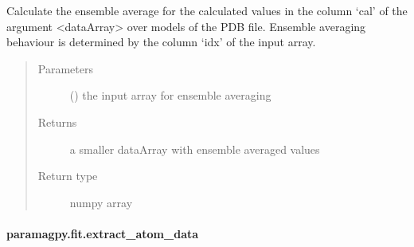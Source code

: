 \documentclass[a4paper,10pt,english,openany,oneside]{sphinxmanual}
\begin{document}
\begin{fulllineitems}
\label{\detokenize{reference/generated/paramagpy.fit.ensemble_average:paramagpy.fit.ensemble_average}}
\sphinxAtStartPar
Calculate the ensemble average for the calculated values in the
column ‘cal’ of the argument \textless{}dataArray\textgreater{} over models of the
PDB file.
Ensemble averaging behaviour is determined by the column ‘idx’
of the input array.
\begin{quote}\begin{description}
\item[{Parameters}] \leavevmode
\sphinxAtStartPar
{} () \textendash{} the input array for ensemble averaging

\item[{Returns}] \leavevmode
\sphinxAtStartPar
{} \textendash{} a smaller dataArray with ensemble averaged values

\item[{Return type}] \leavevmode
\sphinxAtStartPar
numpy array

\end{description}\end{quote}

\end{fulllineitems}



\paragraph{paramagpy.fit.extract\_atom\_data}
\label{\detokenize{reference/generated/paramagpy.fit.extract_atom_data:paramagpy-fit-extract-atom-data}}\label{\detokenize{reference/generated/paramagpy.fit.extract_atom_data::doc}}
\end{document}
